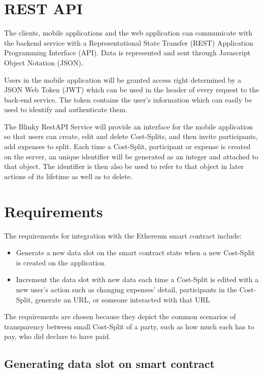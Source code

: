 \documentclass[twoside,numperchapter]{tutthesis} %
\begin{document}
\section{REST API}

The clients, mobile applications and the web application  can communicate with the backend service with a Representational State Transfer (REST)  \citep{REST} Application Programming Interface (API). Data is represented and sent through Javascript Object Notation (JSON).

Users in the mobile application will be granted access right determined by a JSON Web Token (JWT) which can be used in the header of every request to the back-end service. The token contains the user's information which  can easily be used to identify and authenticate them.

The Blinky RestAPI Service will provide an interface for the mobile application so that users can create, edit and delete Cost-Splits, and then invite participants, add expenses to split. Each time a Cost-Split, participant or expense is created on the server, an unique identifier will be generated as an integer and attached to that object. The identifier is then also be used to refer to that object in later actions of its lifetime as well as to delete.
\label{blinkyAPI}

\section{Requirements}
\label{section:requirements}

The requirements for integration with the Ethereum smart contract include:

\begin{itemize}
    \item Generate a new data slot on the smart contract state when a new Cost-Split is created on the application
    \item Increment the data slot with new data each time a Cost-Split is edited with a new user's action such as changing expenses' detail, participants in the Cost-Split, generate an URL, or someone interacted with that URL
\end{itemize}

The requirements are chosen because they depict the common scenarios of transparency between small Cost-Split of a party, such as how much each has to pay, who did declare to have paid.

\subsection{Generating data slot on smart contract}
\end{document}
